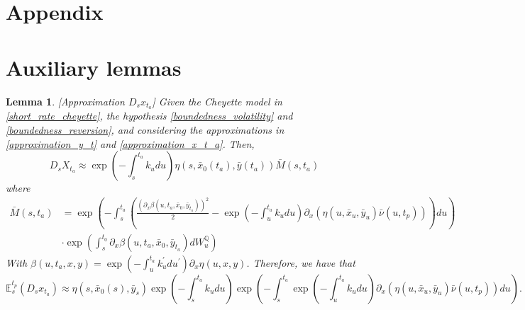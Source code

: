 \documentclass[a4paper,10pt]{article}
\newtheorem{lemma}[theorem]{Lemma}
\newcommand{\1}{\mathbf{1}}
\begin{document}
\section*{Appendix}
\appendix
\renewcommand{\thesection}{\Alph{section}.\arabic{section}}




\section{Auxiliary lemmas}
\begin{lemma}\label{DsX}[Approximation $D_s x_{t_a}$]
Given the Cheyette model in \eqref{short_rate_cheyette}, the hypothesis \ref{boundedness_volatility} and \ref{boundedness_reversion}, and considering the approximations in \eqref{approximation_y_t} and \eqref{approximation_x_t_a}. Then, 
\begin{equation}\label{approximation_D_s_x_t}
D_sX_{t_a} \approx  \exp\left(-\int_{s}^{t_a}k_u du \right) \eta(s,\bar{x}_0(t_a),\bar{y}(t_a))\bar{M}(s,t_a)
\end{equation}
where
\begin{align*}
\bar{M}(s,t_a) &= \exp\left(-\int_{s}^{t_a} \left( \frac{\left(\partial_x \beta(u,t_a,\bar{x}_0,\bar{y}_{t_a})\right)^{2}}{2} - \exp\left(-\int_{u}^{t_a}k_u du\right) \partial_x (\eta(u, \bar{x}_u, \bar{y}_{u}) \bar{\nu}(u,t_p))\right) du \right) \\ 
&\cdot\exp\left(\int_{s}^{t_0} \partial_x \beta(u,t_a,\bar{x}_0,\bar{y}_{t_a}) dW^{\mathbb{Q}}_u \right)
\end{align*}
With $\beta(u,t_a,x,y) = \exp\left(-\int_{u}^{t_a}k_u^{\prime} du^{\prime}\right) \partial_x \eta(u,x,y)$. Therefore, we have that
\begin{equation}\label{approsimation_E_s_x_t}
\mathbb{E}_s^{t_p}\left(D_s x_{t_a}\right) \approx \eta(s,\bar{x}_0(s),\bar{y}_s) \exp\left(-\int_{s}^{t_a}k_u du \right) \exp\left(-\int_{s}^{t_a} \exp\left(-\int_{u}^{t_a}k_u du\right)\partial_x (\eta(u, \bar{x}_u, \bar{y}_{u}) \bar{\nu}(u,t_p)) du \right).
\end{equation}
\end{lemma}
\end{document}
